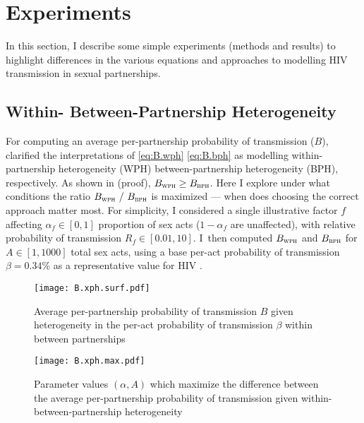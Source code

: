 \section{Experiments}\label{foi.exp}
In this section, I describe some simple experiments (methods and results) to
highlight differences in the various equations and approaches
to modelling HIV transmission in sexual partnerships.
\subsection{Within- \vs Between-Partnership Heterogeneity}\label{foi.exp.xph}
For computing an average per-partnership probability of transmission ($B$),
 clarified the interpretations of
\eqref{eq:B.wph} \vs \eqref{eq:B.bph} as modelling
within-partnership heterogeneity (WPH) \vs between-partnership heterogeneity (BPH), respectively.
As shown in  (proof), $B_{\textsc{wph}} \ge B_{\textsc{bph}}$.
Here I explore under what conditions the ratio $B_{\textsc{wph}}~/~B_{\textsc{bph}}$ is maximized
--- \ie when does choosing the correct approach matter most.
For simplicity, I considered a single illustrative factor $f$
affecting $\alpha_f \in [0,1]$ proportion of sex acts ($1-\alpha_f$ are unaffected),
with relative probability of transmission $R_f \in [0.01,10]$.
I~then computed $B_{\textsc{wph}}$ and $B_{\textsc{bph}}$ for $A \in [1,1000]$ total sex acts,
using a base per-act probability of transmission $\beta = 0.34$\%
as a representative value for HIV \cite{Boily2009}.
\par
\begin{figure}
  \centering\texttt{[image: B.xph.surf.pdf]}
  \caption{Average per-partnership probability of transmission $B$
    given heterogeneity in the per-act probability of transmission $\beta$
    within \vs between partnerships}
  \label{fig:B.xph.surf}
\end{figure}
\begin{figure}
  \centering\texttt{[image: B.xph.max.pdf]}
  \caption{Parameter values $(\alpha,A)$ which maximize the difference between
    the average per-partnership probability of transmission
    given within- \vs between-partnership heterogeneity}
  \label{fig:B.xph.max}
\end{figure}

